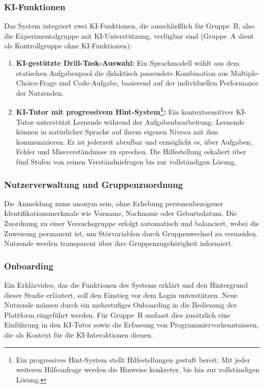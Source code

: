 \subsubsection{KI-Funktionen}

Das System integriert zwei KI-Funktionen, die ausschließlich für Gruppe~B, also die Experimentalgruppe mit KI-Unterstützung, verfügbar sind (Gruppe~A dient als Kontrollgruppe ohne KI-Funktionen):

\begin{enumerate}
    \item \textbf{KI-gestützte Drill-Task-Auswahl:} Ein Sprachmodell wählt aus dem statischen Aufgabenpool die didaktisch passendste Kombination aus Multiple-Choice-Frage und Code-Aufgabe, basierend auf der individuellen Performance der Nutzenden.
    \item \textbf{KI-Tutor mit progressivem Hint-System\footnote{Ein progressives Hint-System stellt Hilfestellungen gestuft bereit: Mit jeder weiteren Hilfeanfrage werden die Hinweise konkreter, bis hin zur vollständigen Lösung.}:} Ein kontextsensitiver KI-Tutor unter\-stützt Lernende während der Aufgabenbearbeitung. Lernende können in natürlicher Sprache auf ihrem eigenen Niveau mit ihm kommunizieren. Er ist jederzeit abrufbar und ermög\-licht es, über Aufgaben, Fehler und Missverständnisse zu sprechen. Die Hilfestellung eskaliert über fünf Stufen von reinen Verständnisfragen bis zur vollständigen Lösung.
\end{enumerate}

\subsubsection{Nutzerverwaltung und Gruppenzuordnung}

Die Anmeldung muss anonym sein, ohne Erhebung personenbezogener Identifikationsmerkmale wie Vorname, Nachname oder Geburtsdatum.
Die Zuordnung zu einer Versuchsgruppe erfolgt automatisch und balanciert, wobei die Zuweisung permanent ist, um Störvariablen durch Gruppenwechsel zu vermeiden.
Nutzende werden transparent über ihre Gruppenzugehörigkeit informiert.

\subsubsection{Onboarding}

Ein Erklärvideo, das die Funktionen des Systems erklärt und den Hintergrund dieser Studie erläutert, soll den Einstieg vor dem Login unterstützen.
Neue Nutzende müssen durch ein mehrstufiges Onboarding in die Bedienung der Plattform eingeführt werden.
Für Gruppe~B umfasst dies zusätzlich eine Einführung in den KI-Tutor sowie die Erfassung von Programmiervorkenntnissen, die als Kontext für die KI-Interaktionen dienen.

